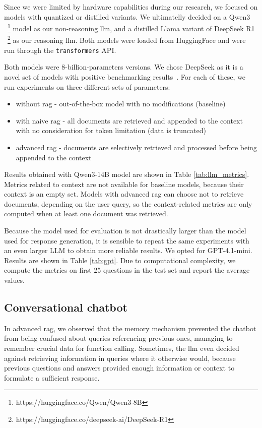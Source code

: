 \documentclass[fleqn,moreauthors,10pt]{ds_report}
\begin{document}
Since we were limited by hardware capabilities during our research, we focused on models with quantized or distilled variants. We ultimatelly decided on a Qwen3 \cite{qwen3}~\footnote{https://huggingface.co/Qwen/Qwen3-8B} model as our non-reasoning \ac{llm}, and a distilled Llama variant of DeepSeek R1 \cite{deepseek3}~\footnote{https://huggingface.co/deepseek-ai/DeepSeek-R1} as our reasoning \ac{llm}. Both models were loaded from HuggingFace and were run through the \texttt{transformers} API.

Both models were 8-billion-parameters versions. We chose DeepSeek as it is a novel set of models with positive benchmarking results~\cite{deepseek3}. For each of these, we run experiments on three different sets of parameters:
\begin{itemize}
\setlength\itemsep{-0.3em}
	\item without \ac{rag} - out-of-the-box model with no modifications (baseline)
	\item with naive \ac{rag} - all documents are retrieved and appended to the context with no consideration for token limitation (data is truncated)
	\item advanced \ac{rag} - documents are selectively retrieved and processed before being appended to the context
\end{itemize}

Results obtained with Qwen3-14B model are shown in Table \ref{tab:llm_metrics}. Metrics related to context are not available for baseline models, because their context is an empty set. Models with advanced \ac{rag} can choose not to retrieve documents, depending on the user query, so the context-related metrics are only computed when at least one document was retrieved.

Because the model used for evaluation is not drastically larger than the model used for response generation, it is sensible to repeat the same experiments with an even larger LLM to obtain more reliable results. We opted for GPT-4.1-mini. Results are shown in Table \ref{tab:gpt}. Due to computational complexity, we compute the metrics on first 25 questions in the test set and report the average values. 

\subsection*{Conversational chatbot}
In advanced \ac{rag}, we observed that the memory mechanism prevented the chatbot from being confused about queries referencing previous ones, managing to remember crucial data for function calling. Sometimes, the \ac{llm} even decided against retrieving information in queries where it otherwise would, because previous questions and answers provided enough information or context to formulate a sufficient response.
\end{document}
